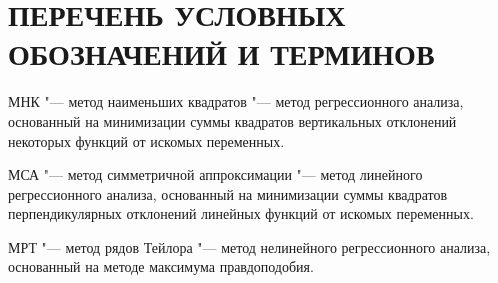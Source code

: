 \chapter*{ПЕРЕЧЕНЬ УСЛОВНЫХ ОБОЗНАЧЕНИЙ И ТЕРМИНОВ}

МНК
"--- метод наименьших квадратов
"--- метод регрессионного анализа,
основанный на минимизации суммы квадратов вертикальных
отклонений некоторых функций от искомых переменных.

МСА
"--- метод симметричной аппроксимации
"--- метод линейного регрессионного анализа,
основанный на минимизации суммы квадратов перпендикулярных
отклонений линейных функций от искомых переменных.

МРТ
"--- метод рядов Тейлора
"--- метод нелинейного регрессионного анализа,
основанный на методе максимума правдоподобия.